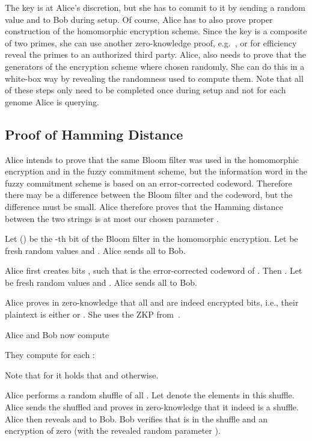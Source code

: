 \documentclass{llncs}
\begin{document}
The key  is at Alice's discretion, but she has to commit to it by sending a random value  and  to Bob during setup.
Of course, Alice has to also prove proper construction of the homomorphic encryption scheme.
Since the key is a composite of two primes, she can use another zero-knowledge proof, e.g.~\cite{CamMic99}, or for efficiency reveal the primes to an authorized third party.
Alice, also needs to prove that the generators of the encryption scheme where chosen randomly.
She can do this in a white-box way by revealing the randomness used to compute them.
Note that all of these steps only need to be completed once during setup and not for each genome Alice is querying.



\subsection{Proof of Hamming Distance}
\label{sec:zkphamming}

Alice intends to prove that the same Bloom filter was used in the homomorphic encryption and in the fuzzy commitment scheme, but the information word in the fuzzy commitment scheme is based on an error-corrected codeword.
Therefore there may be a difference between the Bloom filter and the codeword, but the difference must be small.
Alice therefore proves that the Hamming distance between the two strings is at most our chosen parameter .


Let  () be the -th bit of the Bloom filter  in the homomorphic encryption.
Let  be fresh random values and .
Alice sends all  to Bob.

Alice first creates  bits , such that  is the error-corrected codeword of .
Then .
Let  be fresh random values and .
Alice sends all  to Bob.

Alice proves in zero-knowledge that all  and  are indeed encrypted bits, i.e., their plaintext is either  or .
She uses the ZKP from~\cite{DamJur01}.

Alice and Bob now compute

They compute for each :

Note that for  it holds that  and  otherwise.

Alice performs a random shuffle of all .
Let  denote the elements in this shuffle.
Alice sends the shuffled  and proves in zero-knowledge that it indeed is a shuffle.
Alice then reveals  and  to Bob.
Bob verifies that  is in the shuffle and an encryption of zero (with the revealed random parameter ).
\end{document}
